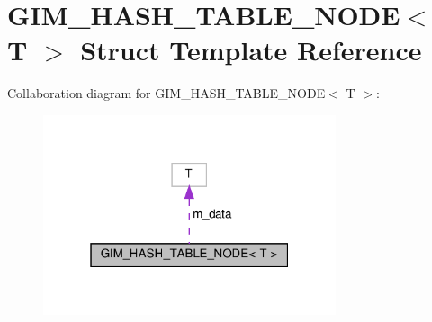 \hypertarget{structGIM__HASH__TABLE__NODE}{}\section{G\+I\+M\+\_\+\+H\+A\+S\+H\+\_\+\+T\+A\+B\+L\+E\+\_\+\+N\+O\+DE$<$ T $>$ Struct Template Reference}
\label{structGIM__HASH__TABLE__NODE}


Collaboration diagram for G\+I\+M\+\_\+\+H\+A\+S\+H\+\_\+\+T\+A\+B\+L\+E\+\_\+\+N\+O\+DE$<$ T $>$\+:
\nopagebreak
\begin{figure}[H]
\begin{center}
\leavevmode
\includegraphics[width=244pt]{structGIM__HASH__TABLE__NODE__coll__graph}
\end{center}
\end{figure}
